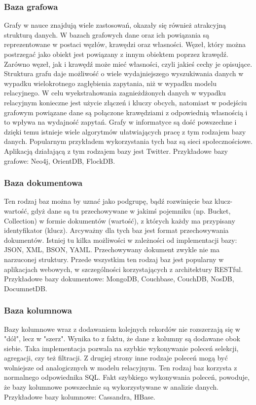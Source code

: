 \documentclass[a4paper,12pt,table]{article}
\begin{document}
{\subsubsection{Baza grafowa}
Grafy w nauce znajdują wiele zastosowań, okazały się również atrakcyjną strukturą danych. W bazach grafowych dane oraz ich powiązania są reprezentowane w postaci węzłów, krawędzi oraz własności. Węzeł, który można postrzegać jako obiekt jest powiązany z innym obiektem poprzez krawędź. Zarówno węzeł, jak i krawędź może mieć własności, czyli jakieś cechy je opisujące. Struktura grafu daje możliwość o wiele wydajniejszego wyszukiwania danych w wypadku wielokrotnego zagłębienia zapytania, niż w wypadku modelu relacyjnego. W celu wyekstrahowania zagnieżdżonych danych w wypadku relacyjnym konieczne jest użycie złączeń i kluczy obcych, natomiast w podejściu grafowym powiązane dane są połączone krawędziami z odpowiednią własnością i to wpływa na wydajność zapytań. Grafy w informatyce są dość powszechne i dzięki temu istnieje wiele algorytmów ułatwiających pracę z tym rodzajem bazy danych. Popularnym przykładem wykorzystania tych baz są sieci społecznościowe. Aplikacją działającą z tym rodzajem bazy jest Twitter. Przykładowe bazy grafowe: Neo4j, OrientDB, FlockDB.
\subsubsection{Baza dokumentowa}
Ten rodzaj baz można by uznać jako podgrupę, bądź rozwinięcie baz klucz-wartość, gdyż dane są tu przechowywane w jakimś pojemniku (np. Bucket, Collection) w formie dokumentów (wartość), z których każdy ma przypisany identyfikator (klucz). Arcyważny dla tych baz jest format przechowywania dokumentów. Istniej tu kilka możliwości w zależności od implementacji bazy: JSON, XML, BSON, YAML. Przechowywany dokument zwykle nie ma narzuconej struktury. Przede wszystkim ten rodzaj baz jest popularny w aplikacjach webowych, w szczególności korzystających z architektury RESTful. Przykładowe bazy dokumentowe: MongoDB, Couchbase, CouchDB, NosDB, DocumnetDB. 
\subsubsection{Baza kolumnowa}
Bazy kolumnowe wraz z dodawaniem kolejnych rekordów nie rozszerzają się w "dół", lecz w "szerz". Wynika to z faktu, że dane z kolumny są dodawane obok siebie. Taka implementacja pozwala na szybkie wykonywanie poleceń selekcji, agregacji, czy też filtracji. Z drugiej strony inne rodzaje poleceń mogą być wolniejsze od analogicznych w modelu relacyjnym. Ten rodzaj baz korzysta z normalnego odpowiednika SQL. Fakt szybkiego wykonywania poleceń, powoduje, że bazy kolumnowe powszechnie są wykorzystywane w analizie danych. Przykładowe bazy kolumnowe: Cassandra, HBase.
\newpage
}
\end{document}
